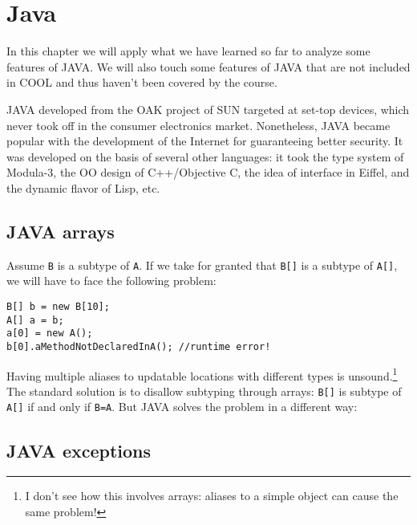 \ifx\PREAMBLE\undefined


\fi
\chapter{Java}
In this chapter we will apply what we have learned so far to analyze some features of JAVA. We will also touch some features of JAVA that are not included in COOL and thus haven't been covered by the course.

JAVA developed from the OAK project of SUN targeted at set-top devices, which never took off in the consumer electronics market. Nonetheless, JAVA became popular with the development of the Internet for guaranteeing better security. It was developed on the basis of several other languages: it took the type system of Modula-3, the OO design of C++/Objective C, the idea of interface in Eiffel, and the dynamic flavor of Lisp, etc. 
\section{JAVA arrays}
Assume \texttt{B} is a subtype of \texttt{A}. If we take for granted that \texttt{B[]} is a subtype of \texttt{A[]}, we will have to face the following problem:
\begin{lstlisting}
B[] b = new B[10];
A[] a = b;
a[0] = new A();
b[0].aMethodNotDeclaredInA(); //runtime error!
\end{lstlisting}
Having multiple aliases to updatable locations with different types is unsound.\footnote{I don't see how this involves arrays: aliases to a simple object can cause the same problem!} The standard solution is to disallow subtyping through arrays: \texttt{B[]} is subtype of \texttt{A[]} if and only if \texttt{B=A}. But JAVA solves the problem in a different way: 
\section{JAVA exceptions}

\ifx\PREAMBLE\undefined

\fi